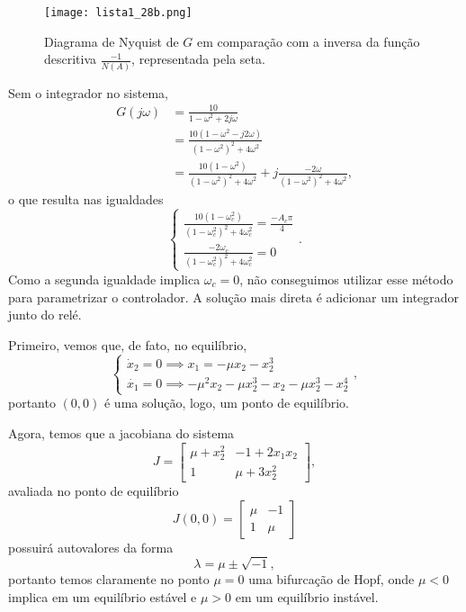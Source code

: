 \documentclass[a4paper]{report}
\begin{document}

\begin{figure}[H]
    \centering
    \texttt{[image: lista1\_28b.png]}
    \caption{Diagrama de Nyquist de $G$ em comparação com a inversa da função descritiva $\frac{-1}{N(A)}$, representada pela seta.}
    \label{fig:lista1_28b-png}
\end{figure}


Sem o integrador no sistema,
\begin{align*}
    G\left( j\omega \right) &= \frac{10}{1-\omega^2 +2j\omega} \\
    &= \frac{10\left( 1-\omega^2 -j2\omega \right) }{\left( 1-\omega^2 \right) ^2 +4\omega^2} \\
    &= \frac{10\left( 1-\omega^2 \right) }{\left( 1-\omega^2 \right) ^2 +4\omega^2} + j\frac{-2\omega}{\left( 1-\omega^2 \right) ^2 +4\omega^2}
,\end{align*}
o que resulta nas igualdades \[
\begin{cases}
    \frac{10\left( 1-\omega_c^2 \right) }{\left( 1-\omega_c^2 \right) ^2 +4\omega_c^2} = \frac{-A_c\pi}{4} \\
    \frac{-2\omega_c}{\left( 1-\omega_c^2 \right) ^2 +4\omega_c^2} = 0
\end{cases}
.\] Como a segunda igualdade implica $\omega_c = 0$, não conseguimos utilizar esse método para parametrizar o controlador. A solução mais direta é adicionar um integrador junto do relé.


Primeiro, vemos que, de fato, no equilíbrio, \[
\begin{cases}
    \dot{x}_2 = 0 \implies x_1 = -\mu x_2 - x_2^3 \\
    \dot{x_1} = 0 \implies -\mu^2 x_2 -\mu x_2^3 - x_2 -\mu x_2^3 -x_2^4
\end{cases} 
,\] portanto $(0,0)$ é uma solução, logo, um ponto de equilíbrio.

Agora, temos que a jacobiana do sistema \[
J = \begin{bmatrix} 
    \mu +x_2^2 & -1 +2x_1x_2 \\
    1 & \mu +3x_2^2
\end{bmatrix} 
,\] avaliada no ponto de equilíbrio \[
J(0,0) = \begin{bmatrix} \mu & -1 \\ 1 & \mu \end{bmatrix} 
\] possuirá autovalores da forma \[
\lambda = \mu \pm \sqrt{-1} 
,\] portanto temos claramente no ponto $\mu=0$ uma bifurcação de Hopf, onde $\mu<0$ implica em um equilíbrio estável e $\mu>0$ em um equilíbrio instável.
\end{document}
